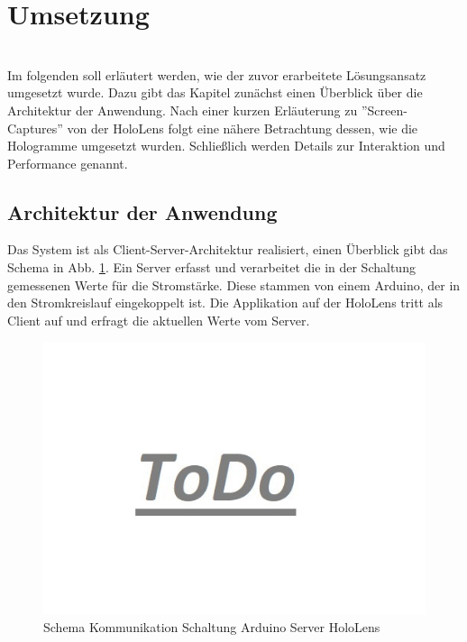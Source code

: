 \section{Umsetzung}
\label{sec-5}
\\

Im folgenden soll erläutert werden, wie der zuvor erarbeitete Lösungsansatz umgesetzt wurde. Dazu gibt das Kapitel zunächst einen Überblick über die Architektur der Anwendung. Nach einer kurzen Erläuterung zu ''Screen-Captures'' von der HoloLens folgt eine nähere Betrachtung dessen, wie die Hologramme umgesetzt wurden. Schließlich werden Details zur Interaktion und Performance genannt.

\subsection{Architektur der Anwendung}
Das System ist als Client-Server-Architektur realisiert, einen Überblick gibt das Schema in Abb. \ref{img:communication-schema}. Ein Server erfasst und verarbeitet die in der Schaltung gemessenen Werte für die Stromstärke. Diese stammen von einem Arduino, der in den Stromkreislauf eingekoppelt ist. Die Applikation auf der HoloLens tritt als Client auf und erfragt die aktuellen Werte vom Server. 
\begin{figure}[h!]
	\centering
	\includegraphics[width=1\textwidth]{images/todo.jpg}
	\caption{Schema Kommunikation Schaltung Arduino Server HoloLens}
	\label{img:communication-schema}
\end{figure}

